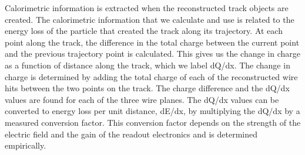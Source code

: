     Calorimetric information is extracted when the reconstructed track objects
    are created. The calorimetric information that we calculate and use is
    related to the energy loss of the particle that created the track along its
    trajectory. At each point along the track, the difference in the total
    charge between the current point and the previous trajectory point is
    calculated. This gives us the change in charge as a function of distance
    along the track, which we label dQ/dx. The change in charge is determined
    by adding the total charge of each of the reconstructed wire hits between
    the two points on the track. The charge difference and the dQ/dx values are
    found for each of the three wire planes. The dQ/dx values can be converted
    to energy loss per unit distance, dE/dx, by multiplying the dQ/dx by a
    measured conversion factor. This conversion factor depends on the strength
    of the electric field and the gain of the readout electronics and is
    determined empirically.


